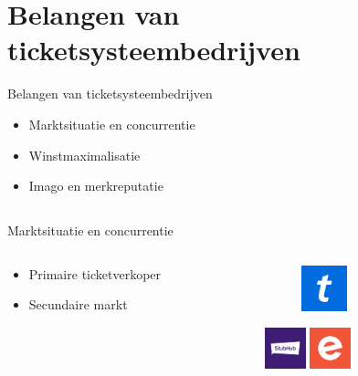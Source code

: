 \documentclass{beamer}
\begin{document}
\section[Bedrijf]{Belangen van ticketsysteembedrijven}
\begin{frame}{Belangen van ticketsysteembedrijven}
    \begin{itemize}
        \item Marktsituatie en concurrentie
        \item Winstmaximalisatie
        \item Imago en merkreputatie
    \end{itemize}
\end{frame}

    \subsection{}
    \begin{frame}{Marktsituatie en concurrentie}
        \begin{columns}
            \begin{column}{.4\textwidth}
                \begin{itemize}
                    \item Primaire ticketverkoper
                    \item Secundaire markt
                \end{itemize}
            \end{column}
            \begin{column}{.6\textwidth}
                \begin{figure}
                    \includegraphics[width=50px,height=50px,keepaspectratio]{ticketmaster-logo.png}
                \end{figure}
                \centering
                \includegraphics[width=45px,height=45px,keepaspectratio]{stubhub-logo.png}
                \includegraphics[width=45px,height=45px,keepaspectratio]{eventbrite-logo.png}
            \end{column}
        \end{columns}
    \end{frame}
    
\end{document}
